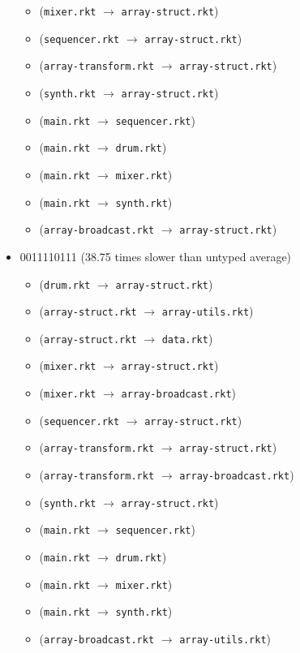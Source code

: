 \documentclass{article}
\newcommand{\mono}[1]{\texttt{#1}}
\begin{document}
\begin{itemize}
\begin{itemize}
  \item (\mono{mixer.rkt} $\rightarrow$ \mono{array-struct.rkt})
  \item (\mono{sequencer.rkt} $\rightarrow$ \mono{array-struct.rkt})
  \item (\mono{array-transform.rkt} $\rightarrow$ \mono{array-struct.rkt})
  \item (\mono{synth.rkt} $\rightarrow$ \mono{array-struct.rkt})
  \item (\mono{main.rkt} $\rightarrow$ \mono{sequencer.rkt})
  \item (\mono{main.rkt} $\rightarrow$ \mono{drum.rkt})
  \item (\mono{main.rkt} $\rightarrow$ \mono{mixer.rkt})
  \item (\mono{main.rkt} $\rightarrow$ \mono{synth.rkt})
  \item (\mono{array-broadcast.rkt} $\rightarrow$ \mono{array-struct.rkt})
  \end{itemize}
\item 0011110111 (38.75 times slower than untyped average)
  \begin{itemize}
  \item (\mono{drum.rkt} $\rightarrow$ \mono{array-struct.rkt})
  \item (\mono{array-struct.rkt} $\rightarrow$ \mono{array-utils.rkt})
  \item (\mono{array-struct.rkt} $\rightarrow$ \mono{data.rkt})
  \item (\mono{mixer.rkt} $\rightarrow$ \mono{array-struct.rkt})
  \item (\mono{mixer.rkt} $\rightarrow$ \mono{array-broadcast.rkt})
  \item (\mono{sequencer.rkt} $\rightarrow$ \mono{array-struct.rkt})
  \item (\mono{array-transform.rkt} $\rightarrow$ \mono{array-struct.rkt})
  \item (\mono{array-transform.rkt} $\rightarrow$ \mono{array-broadcast.rkt})
  \item (\mono{synth.rkt} $\rightarrow$ \mono{array-struct.rkt})
  \item (\mono{main.rkt} $\rightarrow$ \mono{sequencer.rkt})
  \item (\mono{main.rkt} $\rightarrow$ \mono{drum.rkt})
  \item (\mono{main.rkt} $\rightarrow$ \mono{mixer.rkt})
  \item (\mono{main.rkt} $\rightarrow$ \mono{synth.rkt})
  \item (\mono{array-broadcast.rkt} $\rightarrow$ \mono{array-utils.rkt})

\end{itemize}
\end{itemize}
\end{document}
